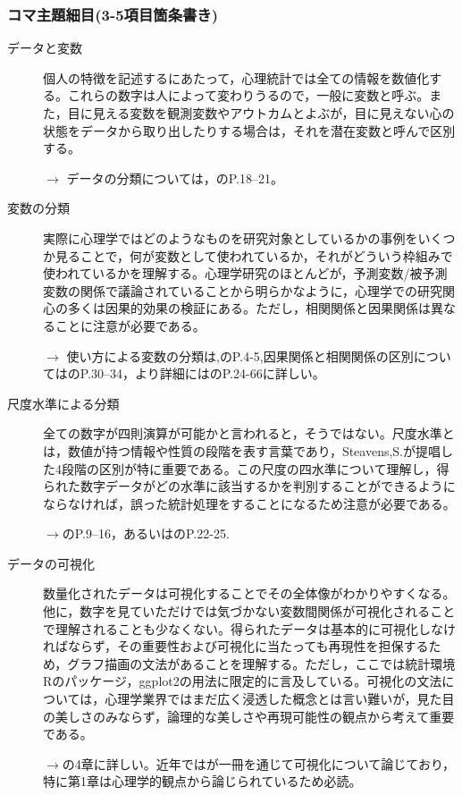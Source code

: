 \subsubsection{コマ主題細目(3-5項目箇条書き)}
\begin{description}
\item[データと変数] 個人の特徴を記述するにあたって，心理統計では全ての情報を数値化する。これらの数字は人によって変わりうるので，一般に変数と呼ぶ。また，目に見える変数を観測変数やアウトカムとよぶが，目に見えない心の状態をデータから取り出したりする場合は，それを潜在変数と呼んで区別する。
\begin{flushright}
    $\to$ データの分類については，\citet{Yamada2004}のP.18--21。
\end{flushright}

\item[変数の分類] 実際に心理学ではどのようなものを研究対象としているかの事例をいくつか見ることで，何が変数として使われているか，それがどういう枠組みで使われているかを理解する。心理学研究のほとんどが，予測変数/被予測変数の関係で議論されていることから明らかなように，心理学での研究関心の多くは因果的効果の検証にある。ただし，相関関係と因果関係は異なることに注意が必要である。
\begin{flushright}
    $\to$ 使い方による変数の分類は,\citet{山内201001}のP.4-5,因果関係と相関関係の区別については\citet{三浦201705}のP.30--34，より詳細には\citet{豊田1992}のP.24-66に詳しい。
\end{flushright}

\item[尺度水準による分類] 全ての数字が四則演算が可能かと言われると，そうではない。尺度水準とは，数値が持つ情報や性質の段階を表す言葉であり，Steavens,S.が提唱した4段階の区別が特に重要である。この尺度の四水準について理解し，得られた数字データがどの水準に該当するかを判別することができるようにならなければ，誤った統計処理をすることになるため注意が必要である。
\begin{flushright}
    $\to$\citet{川端201408}のP.9--16，あるいは\citet{Yamada2004}のP.22-25.
\end{flushright}

\item[データの可視化] 数量化されたデータは可視化することでその全体像がわかりやすくなる。他に，数字を見ていただけでは気づかない変数間関係が可視化されることで理解されることも少なくない。得られたデータは基本的に可視化しなければならず，その重要性および可視化に当たっても再現性を担保するため，グラフ描画の文法があることを理解する。ただし，ここでは統計環境Rのパッケージ，ggplot2の用法に限定的に言及している。可視化の文法については，心理学業界ではまだ広く浸透した概念とは言い難いが，見た目の美しさのみならず，論理的な美しさや再現可能性の観点から考えて重要である。
\begin{flushright}
    $\to$\citet{紀ノ定201806}の4章に詳しい。近年では\citet{Kieran2018}が一冊を通じて可視化について論じており，特に第1章は心理学的観点から論じられているため必読。
\end{flushright}


\end{description}
